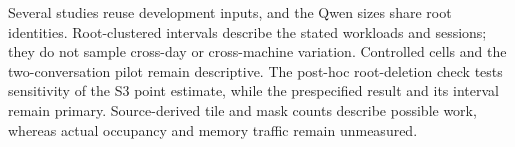 Several studies reuse development inputs, and the Qwen sizes share root identities. Root-clustered intervals describe the stated workloads and sessions; they do not sample cross-day or cross-machine variation. Controlled cells and the two-conversation pilot remain descriptive. The post-hoc root-deletion check tests sensitivity of the S3 point estimate, while the prespecified result and its interval remain primary. Source-derived tile and mask counts describe possible work, whereas actual occupancy and memory traffic remain unmeasured.
